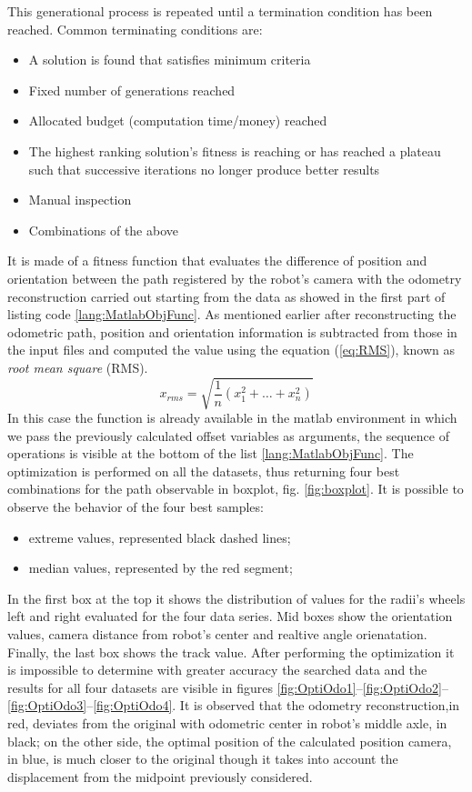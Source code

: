 This generational process is repeated until a termination condition has been reached. Common terminating conditions are:
\begin{itemize}
\item A solution is found that satisfies minimum criteria
\item Fixed number of generations reached
\item Allocated budget (computation time/money) reached
\item The highest ranking solution's fitness is reaching or has reached a plateau such that successive iterations no longer produce better results
\item Manual inspection
\item Combinations of the above
\end{itemize}
\noindent It is made of a fitness function that evaluates the difference of position and orientation between the path registered by the robot's camera with the odometry reconstruction carried out starting from the data as showed in the first part of listing code \ref{lang:MatlabObjFunc}. 
As mentioned earlier after reconstructing the odometric path, position and orientation information is subtracted from those in the input files and computed the value using the equation (\ref{eq:RMS}), known as \emph{root mean square} (RMS). 
\begin{equation}
x_{rms} = \sqrt{\frac{1}{n}(x_1^2 + \dots + x_n^2)}
\label{eq:RMS}
\end{equation}
In this case the function is already available in the matlab environment in which we pass the previously calculated offset variables as arguments, the sequence of operations is visible at the bottom of the list \ref{lang:MatlabObjFunc}.
The optimization is performed on all the datasets, thus returning four best combinations for the path observable in boxplot, fig. \ref{fig:boxplot}. It is possible to observe the behavior of the four best samples:
\begin{itemize}
\item extreme values, represented black dashed lines;
\item median values, represented by the red segment;
\end{itemize}
In the first box at the top it shows the distribution of values for the radii's wheels left and right evaluated for the four data series.
Mid boxes show the orientation values, camera distance from robot's center and realtive angle orienatation.
Finally, the last box shows the track value.
After performing the optimization it is impossible to determine with greater accuracy the searched data and the results for all four datasets are visible in figures \ref{fig:OptiOdo1}--\ref{fig:OptiOdo2}--\ref{fig:OptiOdo3}--\ref{fig:OptiOdo4}.
It is observed that the odometry reconstruction,in red, deviates from the original with odometric center in robot's middle axle, in black; on the other side, the optimal position of the calculated position camera, in blue, is much closer to the original though it takes into account the displacement from the midpoint previously considered.